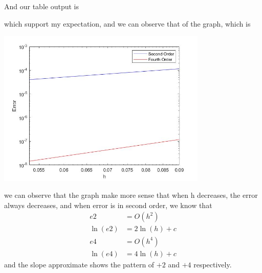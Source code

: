 \documentclass{article}
\begin{document}
\begin{enumerate}
\begin{enumerate}
 
 
 And our table output is 
 \begin{small}
 
 \end{small}
 which support my expectation, and we can observe that of the graph, which is 
  \begin{center}
  \includegraphics[width=10cm]{24_9.jpg} 
 \end{center}
 we can observe that the graph make more sense that when h decreases, the error always decreases, and when error is in second order, we know that \begin{align*}
 e2 &=O(h^2)\\
 \ln(e2)&=2 \ln(h) +c\\
  e4 &=O(h^4)\\
 \ln(e4)&=4 \ln(h) +c
\end{align*}  
 and the slope approximate shows the pattern of $+2$ and $+4$ respectively.
 

\end{enumerate}
\end{enumerate}
\end{document}
